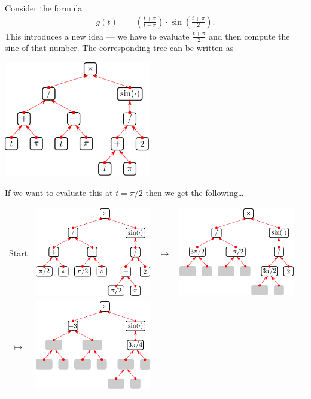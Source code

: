 \begin{eg}
Consider the formula
  \begin{align*}
  g(t) &= \left(\frac{t+\pi}{t-\pi} \right) \cdot \sin\left( \frac{t+\pi}{2}
\right).
\end{align*}
  This introduces a new idea --- we have to evaluate $\frac{t+\pi}{2}$ and then
compute the sine of that number. The corresponding tree can be written as
\begin{efig}
\begin{center}
\includegraphics[height=5cm]{tree2}
\end{center}
\end{efig}
  If we want to evaluate this at $t = \pi/2$ then we get the following\dots
\begin{wfig}
\begin{center}
\begin{tabular}{c m{58mm} c m{58mm} c}
  Start
  & \includegraphics[width=55mm]{tree2a}
  & $\mapsto$
  & \includegraphics[width=55mm]{tree2b}
  &
  \\[15ex]
  $\mapsto$
  & \includegraphics[width=55mm]{tree2c}

\end{tabular}
\end{center}
\end{wfig}
\end{eg}
